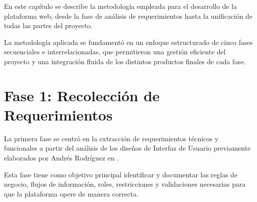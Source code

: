 En este capítulo se describe la metodología empleada para el desarrollo de la plataforma web,
desde la fase de análisis de requerimientos hasta la unificación de todas las partes del proyecto.

La metodología aplicada se fundamentó en un enfoque estructurado de cinco fases secuenciales e
interrelacionadas, que permitieron una gestión eficiente del proyecto y una integración fluida de
los distintos productos finales de cada fase.

\section{Fase 1: Recolección de Requerimientos}
La primera fase se centró en la extracción de requerimientos técnicos y funcionales a partir del
análisis de los diseños de Interfaz de Usuario previamente elaborados por Andrés Rodríguez en
\cite{Rodríguez_Dis_2023}.

Esta fase tiene como objetivo principal identificar y documentar las reglas de negocio, flujos de
información, roles, restricciones y validaciones necesarias para que la plataforma opere de manera correcta.

